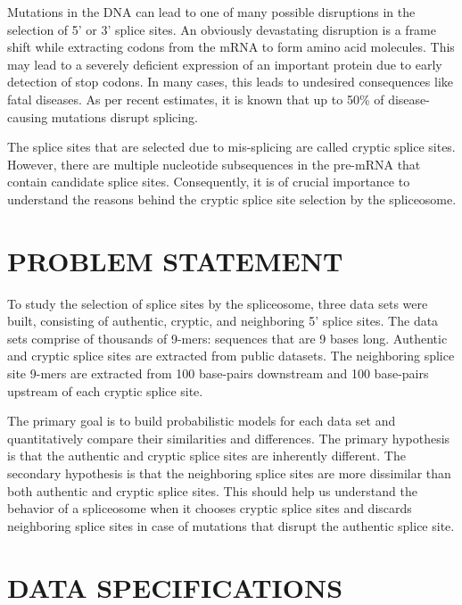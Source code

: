 \documentclass[12pt,a4paper]{article}
\begin{document}
	Mutations in the DNA can lead to one of many possible disruptions in the selection of 5’ or 3’ splice sites. An obviously devastating disruption is a frame shift while extracting codons from the mRNA to form amino acid molecules. This may lead to a severely deficient expression of an important protein due to early detection of stop codons. In many cases, this leads to undesired consequences like fatal diseases. As per recent estimates, it is known that up to 50\% of disease-causing mutations disrupt splicing. \par
	The splice sites that are selected due to mis-splicing are called cryptic splice sites. However, there are multiple nucleotide subsequences in the pre-mRNA that contain candidate splice sites. Consequently, it is of crucial importance to understand the reasons behind the cryptic splice site selection by the spliceosome.
	

	\section{\large PROBLEM STATEMENT} \label{sec:problem}
	To study the selection of splice sites by the spliceosome, three data sets were built, consisting of authentic, cryptic, and neighboring 5’ splice sites. The data sets comprise of thousands of 9-mers: sequences that are 9 bases long. Authentic and cryptic splice sites are extracted from public datasets. The neighboring splice site 9-mers are extracted from 100 base-pairs downstream and 100 base-pairs upstream of each cryptic splice site. \par
	The primary goal is to build probabilistic models for each data set and quantitatively compare their similarities and differences. The primary hypothesis is that the authentic and cryptic splice sites are inherently different. The secondary hypothesis is that the neighboring splice sites are more dissimilar than both authentic and cryptic splice sites. This should help us understand the behavior of a spliceosome when it chooses cryptic splice sites and discards neighboring splice sites in case of mutations that disrupt the authentic splice site.
    
    \section{DATA SPECIFICATIONS}
\end{document}
